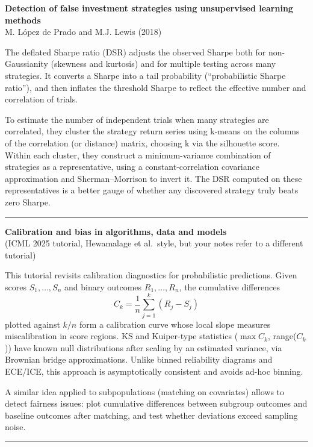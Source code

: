 \documentclass[a5paper]{article}
\begin{document}
\textbf{Detection of false investment strategies using unsupervised
learning methods}\\
M. López de Prado and M.J. Lewis (2018)

The deflated Sharpe ratio (DSR) adjusts the observed Sharpe both for
non-Gaussianity (skewness and kurtosis) and for multiple testing across
many strategies. It converts a Sharpe into a tail probability
(``probabilistic Sharpe ratio''), and then inflates the threshold Sharpe
to reflect the effective number and correlation of trials.

To estimate the number of independent trials when many strategies are
correlated, they cluster the strategy return series using k-means on the
columns of the correlation (or distance) matrix, choosing k via the
silhouette score. Within each cluster, they construct a minimum-variance
combination of strategies as a representative, using a
constant-correlation covariance approximation and Sherman--Morrison to
invert it. The DSR computed on these representatives is a better gauge
of whether any discovered strategy truly beats zero Sharpe.

\begin{center}\rule{0.5\linewidth}{0.5pt}\end{center}

\textbf{Calibration and bias in algorithms, data and models}\\
(ICML 2025 tutorial, Hewamalage et al.~style, but your notes refer to a
different tutorial)

This tutorial revisits calibration diagnostics for probabilistic
predictions. Given scores $S_1,\ldots,S_n$ and binary outcomes $R_1,\ldots,R_n$,
the cumulative differences
\[ C_k = \frac1n \sum_{j=1}^k (R_j - S_j) \]
plotted against $k/n$ form a calibration curve whose local slope measures
miscalibration in score regions. KS and Kuiper-type statistics
($\max C_k$, range($C_k$)) have known null distributions after
scaling by an estimated variance, via Brownian bridge approximations.
Unlike binned reliability diagrams and ECE/ICE, this approach is
asymptotically consistent and avoids ad-hoc binning.

A similar idea applied to subpopulations (matching on covariates) allows
to detect fairness issues: plot cumulative differences between subgroup
outcomes and baseline outcomes after matching, and test whether
deviations exceed sampling noise.

\begin{center}\rule{0.5\linewidth}{0.5pt}\end{center}
\end{document}
